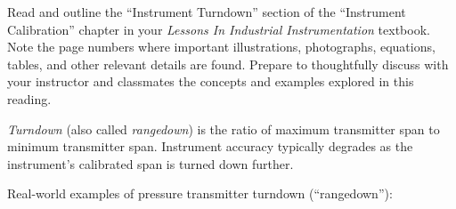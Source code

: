 

Read and outline the ``Instrument Turndown'' section of the ``Instrument Calibration'' chapter in your {\it Lessons In Industrial Instrumentation} textbook.  Note the page numbers where important illustrations, photographs, equations, tables, and other relevant details are found.  Prepare to thoughtfully discuss with your instructor and classmates the concepts and examples explored in this reading.














{\it Turndown} (also called {\it rangedown}) is the ratio of maximum transmitter span to minimum transmitter span.  Instrument accuracy typically degrades as the instrument's calibrated span is turned down further.

\vskip 10pt

Real-world examples of pressure transmitter turndown (``rangedown''): 

